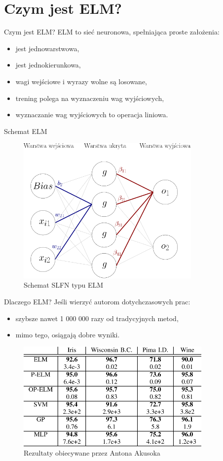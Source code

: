 \documentclass{beamer}
\begin{document}
\section{Czym jest ELM?}
\begin{frame}{Czym jest ELM?}
ELM to sieć neuronowa, spełniająca proste założenia:
\begin{itemize}
\item jest jednowarstwowa,
\item jest jednokierunkowa,
\item wagi wejściowe i wyrazy wolne są losowane,
\item trening polega na wyznaczeniu wag wyjściowych,
\item wyznaczanie wag wyjściowych to operacja liniowa.
\end{itemize}
\end{frame}
\begin{frame}{Schemat ELM}
\begin{figure}[H]
\centering
\includegraphics[width=0.8\textwidth]{schemat_sieci.png}
\caption{Schemat SLFN typu ELM}
\end{figure}
\end{frame}
\begin{frame}{Dlaczego ELM?}
Jeśli wierzyć autorom dotychczasowych prac:
\begin{itemize}
\item szybsze nawet 1 000 000 razy od tradycyjnych metod,
\item mimo tego, osiągają dobre wyniki.
\end{itemize}
\begin{figure}[H]
\centering
\includegraphics[width=0.85\textwidth]{obiecywane_rezultaty.png}
\caption{Rezultaty obiecywane przez Antona Akusoka}
\end{figure}
\end{frame}
\end{document}
